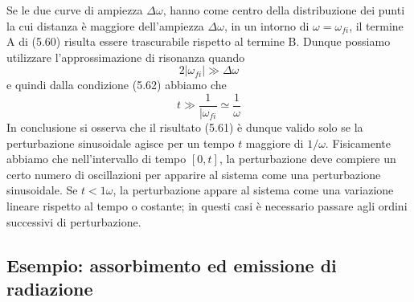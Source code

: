 Se le due curve di ampiezza $\Delta \omega$, hanno come centro della distribuzione dei punti la cui distanza \`e maggiore dell'ampiezza $\Delta \omega$, in un intorno di $\omega = \omega_{fi}$, il termine A di (5.60) risulta essere trascurabile rispetto al termine B. Dunque possiamo utilizzare l'approssimazione di risonanza quando
\begin{equation}
	2|\omega_{fi}| \gg \Delta \omega
\end{equation} 
e quindi dalla condizione (5.62) abbiamo che 
\begin{equation*}
	t \gg \frac{1}{|\omega_{fi}} \simeq \frac{1}{\omega}
\end{equation*}
In conclusione si osserva che il risultato (5.61) \`e dunque valido solo se la perturbazione sinusoidale agisce per un tempo $t$ maggiore di $1/\omega$. Fisicamente abbiamo che nell'intervallo di tempo $[0,t]$, la perturbazione deve compiere un certo numero di oscillazioni per apparire al sistema come una perturbazione sinusoidale. Se $t < 1 \omega$, la perturbazione appare al sistema come una variazione lineare rispetto al tempo o costante; in questi casi \`e necessario passare agli ordini successivi di perturbazione.

\subsection{Esempio: assorbimento ed emissione di radiazione}

			




